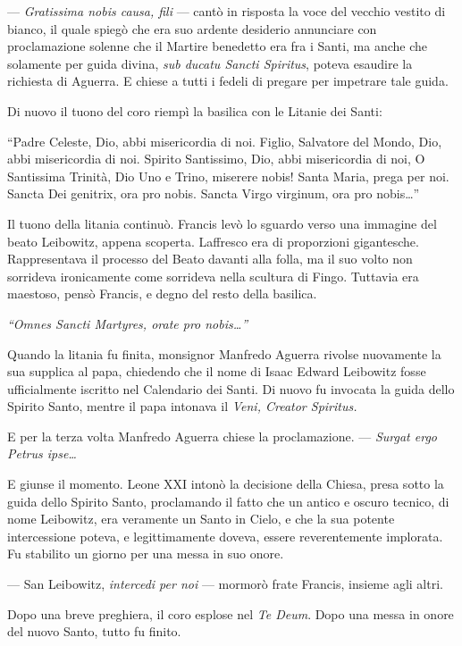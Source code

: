 --- \emph{Gratissima nobis causa, fili} --- cantò in risposta la voce
del vecchio vestito di bianco, il quale spiegò che era suo ardente
desiderio annunciare con proclamazione solenne che il Martire benedetto
era fra i Santi, ma anche che solamente per guida divina, \emph{sub
	ducatu Sancti Spiritus}, poteva esaudire la richiesta di Aguerra. E
chiese a tutti i fedeli di pregare per impetrare tale guida.

Di nuovo il tuono del coro riempì la basilica con le Litanie dei Santi:

``Padre Celeste, Dio, abbi misericordia di noi. Figlio, Salvatore del
Mondo, Dio, abbi misericordia di noi. Spirito Santissimo, Dio, abbi
misericordia di noi, O Santissima Trinità, Dio Uno e Trino, miserere
nobis! Santa Maria, prega per noi. Sancta Dei genitrix, ora pro nobis.
Sancta Virgo virginum, ora pro nobis\ldots''

Il tuono della litania continuò. Francis levò lo sguardo verso una
immagine del beato Leibowitz, appena scoperta.
L\textquotesingle affresco era di proporzioni gigantesche. Rappresentava
il processo del Beato davanti alla folla, ma il suo volto non sorrideva
ironicamente come sorrideva nella scultura di Fingo. Tuttavia era
maestoso, pensò Francis, e degno del resto della basilica.

\emph{``Omnes Sancti Martyres, orate pro nobis\ldots''}

Quando la litania fu finita, monsignor Manfredo Aguerra rivolse
nuovamente la sua supplica al papa, chiedendo che il nome di Isaac
Edward Leibowitz fosse ufficialmente iscritto nel Calendario dei Santi.
Di nuovo fu invocata la guida dello Spirito Santo, mentre il papa
intonava il \emph{Veni, Creator Spiritus.}

E per la terza volta Manfredo Aguerra chiese la proclamazione. ---
\emph{Surgat ergo Petrus ipse\ldots{}}

E giunse il momento. Leone XXI intonò la decisione della Chiesa, presa
sotto la guida dello Spirito Santo, proclamando il fatto che un antico e
oscuro tecnico, di nome Leibowitz, era veramente un Santo in Cielo, e
che la sua potente intercessione poteva, e legittimamente doveva, essere
reverentemente implorata. Fu stabilito un giorno per una messa in suo
onore.

--- San Leibowitz, \emph{intercedi per noi} --- mormorò frate Francis,
insieme agli altri.

Dopo una breve preghiera, il coro esplose nel \emph{Te Deum}. Dopo una
messa in onore del nuovo Santo, tutto fu finito.

